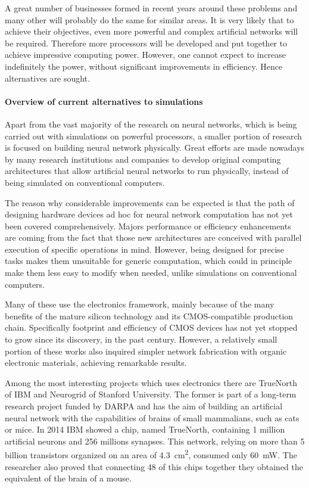 A great number of businesses formed in recent years around these problems and many other will probably do the same for similar areas.
It is very likely that to achieve their objectives, even more powerful and complex artificial networks will be required.
Therefore more processors will be developed and put together to achieve impressive computing power.
However, one cannot expect to increase indefinitely the power, without significant improvements in efficiency.
Hence alternatives are sought.

\paragraph{Overview of current alternatives to simulations\\}

Apart from the vast majority of the research on neural networks, which is being carried out with simulations on powerful processors, a smaller portion of research is focused on building neural network physically.
Great efforts are made nowadays by many research institutions and companies to develop original computing architectures that allow artificial neural networks to run physically, instead of being simulated on conventional computers.

The reason why considerable improvements can be expected is that the path of designing hardware devices ad hoc for neural network computation has not yet been covered comprehensively.
Majors performance or efficiency enhancements are coming from the fact that those new architectures are conceived with parallel execution of specific operations in mind.
However, being designed for precise tasks makes them unsuitable for generic computation, which could in principle make them less easy to modify when needed, unlike simulations on conventional computers.

Many of these use the electronics framework, mainly because of the many benefits of the mature silicon technology and its CMOS-compatible production chain.
Specifically footprint and efficiency of CMOS devices has not yet stopped to grow since its discovery, in the past century.
However, a relatively small portion of these works also inquired simpler network fabrication with organic electronic materials, achieving remarkable results.

Among the most interesting projects which uses electronics there are TrueNorth of IBM and Neurogrid of Stanford University.
The former is part of a long-term research project funded by DARPA and has the aim of building an artificial neural network with the capabilities of brains of small mammalians, such as cats or mice.
In 2014 IBM showed a chip, named TrueNorth, containing 1 million artificial neurons and 256 millions synapses.
This network, relying on more than 5 billion transistors organized on an area of \SI{4.3}{\square\cm}, consumed only \SI{60}{\mW}.
The researcher also proved that connecting 48 of this chips together they obtained the equivalent of the brain of a mouse.

